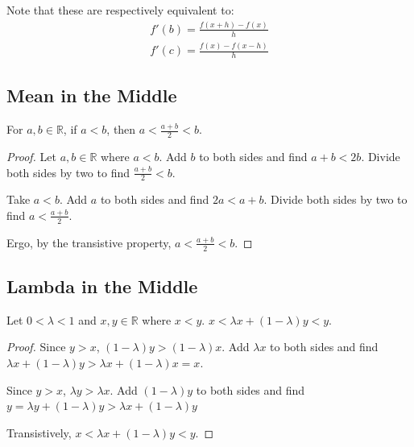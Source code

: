 \documentclass[11pt]{article}
\begin{document}
        Note that these are respectively equivalent to:
        \begin{gather}
            f'(b) = \frac{f(x + h) - f(x)}{h}\\
            f'(c) = \frac{f(x) - f(x - h)}{h}
        \end{gather}
    
    \subsection{Mean in the Middle}
        \label{thm:0.5}
        For $a,b \in \mathbb{R}$, if $a < b$, then $a < \frac{a + b}{2} < b$.
        \begin{proof}
            Let $a,b \in \mathbb{R}$ where $a < b$.
            Add $b$ to both sides and find $a + b < 2b$.
            Divide both sides by two to find $\frac{a + b}{2} < b$.

            Take $a < b$.
            Add $a$ to both sides and find $2a < a + b$.
            Divide both sides by two to find $a < \frac{a + b}{2}$.

            Ergo, by the transistive property, $a < \frac{a + b}{2} < b$.
        \end{proof}

    \subsection{Lambda in the Middle}
        \label{thm:0.6}
        Let $0 < \lambda < 1$ and $x,y \in \mathbb{R}$ where $x < y$.
        $x < \lambda x + (1 - \lambda)y < y$.
        \begin{proof}
            Since $y > x$, $(1 - \lambda)y > (1 - \lambda)x$.
            Add $\lambda x$ to both sides and find $\lambda x + (1 - \lambda)y > \lambda x + (1 - \lambda)x = x$.

            Since $y > x$, $\lambda y > \lambda x$.
            Add $(1 - \lambda)y$ to both sides and find $y = \lambda y + (1 - \lambda)y > \lambda x + (1 - \lambda)y$
            
            Transistively, $x < \lambda x + (1 - \lambda)y < y$.
        \end{proof}

\pagebreak
\end{document}
